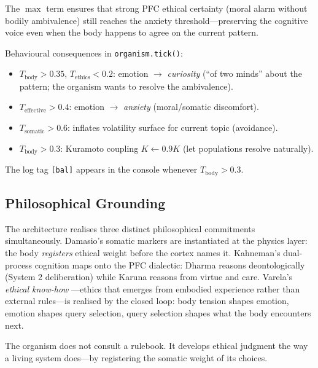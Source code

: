 \documentclass[11pt,a4paper,twocolumn]{article}
\begin{document}
The $\max$ term ensures that strong PFC ethical certainty (moral alarm without bodily ambivalence)
still reaches the anxiety threshold---preserving the cognitive voice even when the body happens to
agree on the current pattern.

Behavioural consequences in \texttt{organism.tick()}:
\begin{itemize}
\item $T_{\text{body}} > 0.35$, $T_{\text{ethics}} < 0.2$: emotion $\to$ \emph{curiosity}
  (``of two minds'' about the pattern; the organism wants to resolve the ambivalence).
\item $T_{\text{effective}} > 0.4$: emotion $\to$ \emph{anxiety} (moral/somatic discomfort).
\item $T_{\text{somatic}} > 0.6$: inflates volatility surface for current topic (avoidance).
\item $T_{\text{body}} > 0.3$: Kuramoto coupling $K \leftarrow 0.9K$ (let populations resolve naturally).
\end{itemize}

The log tag \texttt{[bal]} appears in the console whenever $T_{\text{body}} > 0.3$.

\subsection{Philosophical Grounding}

The architecture realises three distinct philosophical commitments simultaneously.
Damasio's somatic markers \citep{damasio1999} are instantiated at the physics layer:
the body \emph{registers} ethical weight before the cortex names it.
Kahneman's dual-process cognition \citep{kahneman2011} maps onto the PFC dialectic:
Dharma reasons deontologically (System 2 deliberation) while Karuna reasons from virtue and care.
Varela's \emph{ethical know-how} \citep{varela1999ethical}---ethics that emerges from embodied
experience rather than external rules---is realised by the closed loop:
body tension shapes emotion, emotion shapes query selection, query selection shapes what the body
encounters next.

The organism does not consult a rulebook. It develops ethical judgment the way a living system
does---by registering the somatic weight of its choices.


\end{document}
